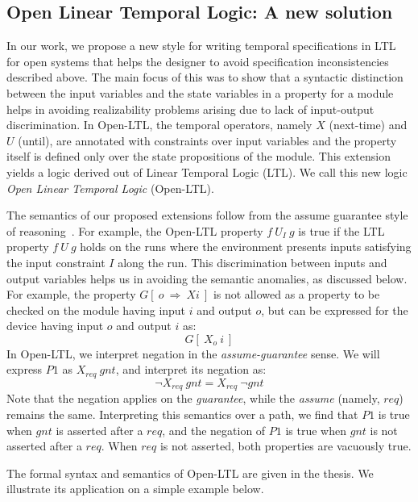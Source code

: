 \documentclass[a4paper, 11pt]{article}
\begin{document}
\subsection{Open Linear Temporal Logic: A new solution} \label{sec6.3}
\noindent
In our work, we propose a new style for writing temporal specifications 
in LTL for open systems that helps the designer to avoid specification 
inconsistencies described above.
The main focus of this was to show that a syntactic distinction between
the input variables and the state variables in a property for a module helps
in avoiding realizability problems arising due to lack of input-output 
discrimination. In Open-LTL, the temporal operators,
namely $X$ (next-time) and $U$ (until), are
annotated with constraints over input variables 
and the property itself is defined only over the
state propositions of the module. This extension yields a 
logic derived out of Linear Temporal Logic (LTL). We call this new logic
{\em Open Linear Temporal Logic} (Open-LTL).

\noindent
The semantics of our proposed extensions follow from the assume
guarantee style of reasoning~\cite{henzinger}. For example, the Open-LTL
property $f\ U_{I}\ g$
is true if the LTL property $f\ U\ g$ holds on the runs where the environment
presents inputs satisfying the input constraint $I$ along the run. This 
discrimination between inputs and output variables helps us in avoiding 
the semantic anomalies, as discussed below.
For example, the property
$G[\ o\ \Rightarrow\ X i\ ]$ is not allowed as a property to be
checked on the module having input $i$ and output $o$, but can be expressed 
for the device having input $o$ and output $i$ as:
\[ G[\ X_{o}\ i\ ] \]
In Open-LTL, we interpret negation in the {\em assume-guarantee} sense. We will
express $P1$ as $X_{req}\ gnt$, and interpret its negation as:
\[ \neg X_{req}\ gnt = X_{req}\ \neg gnt \]
Note that the negation applies on the {\em guarantee}, while the {\em assume}
(namely, $req$) remains the same. Interpreting this semantics over a path,
we find that $P1$ is true when $gnt$ is asserted after a $req$, and the
negation of $P1$ is true when $gnt$ is not asserted after a $req$. When
$req$ is not asserted, both properties are vacuously true.

The formal syntax and semantics of Open-LTL are given in the thesis. We 
illustrate its application on a simple example below.
\end{document}

